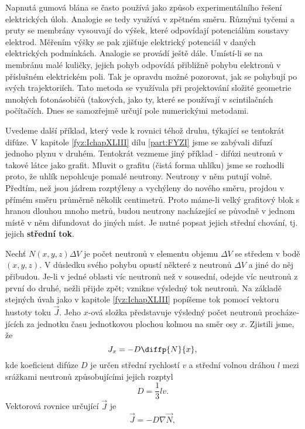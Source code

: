     Napnutá gumová blána se často používá jako způsob experimentálního řešení elektrických úloh.
    Analogie se tedy využívá v zpětném směru. Různými tyčemi a pruty se membrány vysouvají do výšek,
    které odpovídají potenciálům soustavy elektrod. Měřením výšky se pak zjišťuje elektrický
    potenciál v daných elektrických podmínkách. Analogie se provádí ještě dále. Umístí-li se na
    membránu malé kuličky, jejich pohyb odpovídá přibližně pohybu elektronů v příslušném elektrickém
    poli. Tak je opravdu možné pozorovat, jak se  pohybují po svých trajektoriích.
    Tato metoda se využívala při projektování složité geometrie mnohých fotonásobičů (takových, jako
    ty, které se používají v scintilačních počítačích. Dnes se samozřejmě určují pole numerickými
    metodami.

  
    Uvedeme další příklad, který vede k rovnici téhož druhu, týkající se tentokrát difúze. V
    ka­pitole \ref{fyz:IchapXLIII} dílu \ref{part:FYZI} jsme se zabývali difuzí jednoho plynu v
    druhém. Tentokrát vezmeme jiný příklad - difúzi neutronů v takové látce jako grafit. Mluvit o
    grafitu (čistá forma uhlíku) jsme se rozhodli proto, že uhlík nepohlcuje pomalé neutrony.
    Neutrony v něm putují volně. Předtím, než jsou jádrem rozptýleny a vychýleny do nového směru,
    projdou v přímém směru průměrně několik centimetrů. Proto máme-li velký grafitový blok s hranou
    dlouhou mnoho metrů, budou neutrony nacházející se původně v jednom místě v něm difundovat do
    jiných míst. Je nutné popsat jejich střední chování, tj. jejich \textbf{střední tok}.

    Nechť \(N(x, y, z)\Delta V\) je počet neutronů v elementu objemu \(\Delta V\) se středem v bodě
    \((x, y, z)\). V důsledku svého pohybu opustí některé z neutronů \(\Delta V\) a jiné do něj
    přibudou. Je-li v jedné oblasti víc neutronů než v sousední, odejde víc neutronů z první do
    druhé, nežli přijde zpět; vznikne výsledný tok neutronů. Na základě stejných úvah jako v
    kapitole \ref{fyz:IchapXLIII} popíšeme tok pomocí vektoru hustoty toku \(\vec{J}\). Jeho
    \(x\)-ová složka představuje výsledný počet neutronů procháze­jících za jednotku času
    jednotkovou plochou kolmou na směr osy \(x\). Zjistili jsme, že
    \begin{equation}\label{fyz:eq774}
      J_x = -D\diffp{N}{x},
    \end{equation} 
    kde koeficient difúze \(D\) je určen střední rychlostí \(v\) a střední volnou dráhou \(l\) mezi
    srážkami neutronů způsobujícími jejich rozptyl
    \begin{equation*}
      D = \frac{1}{3}lv.
    \end{equation*}
    Vektorová rovnice určující \(\vec{J}\) je
    \begin{equation}\label{fyz:eq775}
      \vec{J} = -D\nabla\vec{N},
    \end{equation} 

